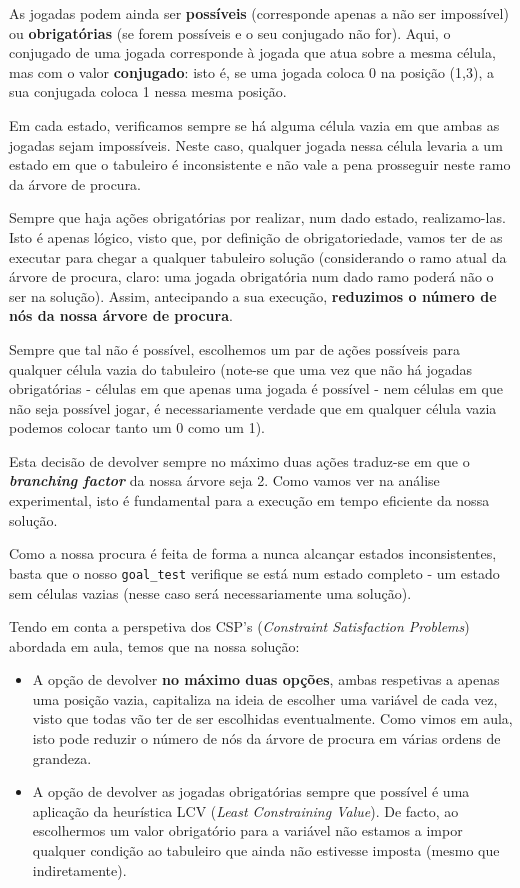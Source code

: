 \documentclass[12pt,a4paper]{article}
\begin{document}
As jogadas podem ainda ser \textbf{possíveis} (corresponde apenas a não ser impossível)
ou \textbf{obrigatórias} (se forem possíveis e o seu conjugado não for).
Aqui, o conjugado de uma jogada corresponde à jogada que atua sobre a mesma célula,
mas com o valor \textbf{conjugado}: isto é, se uma jogada coloca 0 na posição (1,3),
a sua conjugada coloca 1 nessa mesma posição.

Em cada estado, verificamos sempre se há alguma célula vazia em que ambas as jogadas
sejam impossíveis.
Neste caso, qualquer jogada nessa célula levaria a um estado em que o tabuleiro é
inconsistente e não vale a pena prosseguir neste ramo da árvore de procura.

Sempre que haja ações obrigatórias por realizar, num dado estado, realizamo-las.
Isto é apenas lógico, visto que, por definição de obrigatoriedade, vamos ter de
as executar para chegar a qualquer tabuleiro solução (considerando o ramo
atual da árvore de procura, claro: uma jogada obrigatória num dado ramo poderá
não o ser na solução).
Assim, antecipando a sua execução, \textbf{reduzimos o número de nós da nossa árvore de procura}.

Sempre que tal não é possível, escolhemos um par de ações possíveis para qualquer
célula vazia do tabuleiro (note-se que uma vez que não há jogadas obrigatórias -
células em que apenas uma jogada é possível - nem células em que não seja possível jogar,
é necessariamente verdade que em qualquer célula vazia podemos colocar tanto um 0 como um 1).

Esta decisão de devolver sempre no máximo duas ações traduz-se em que o \textbf{\textit{branching factor}}
da nossa árvore seja 2.
Como vamos ver na análise experimental, isto é fundamental para a execução em tempo
eficiente da nossa solução.

Como a nossa procura é feita de forma a nunca alcançar estados inconsistentes, basta
que o nosso \texttt{goal\_test} verifique se está num estado completo - um estado
sem células vazias (nesse caso será necessariamente uma solução).

Tendo em conta a perspetiva dos CSP's (\textit{Constraint Satisfaction Problems})
abordada em aula, temos que na nossa solução:
\begin{itemize}
      \item A opção de devolver \textbf{no máximo duas opções}, ambas respetivas a apenas uma
            posição vazia, capitaliza na ideia de escolher uma variável de cada vez, visto
            que todas vão ter de ser escolhidas eventualmente.
            Como vimos em aula, isto pode reduzir o número de nós da árvore de procura
            em várias ordens de grandeza.
      \item A opção de devolver as jogadas obrigatórias sempre que possível é uma
            aplicação da heurística LCV (\textit{Least Constraining Value}).
            De facto, ao escolhermos um valor obrigatório para a variável não estamos
            a impor qualquer condição ao tabuleiro que ainda não estivesse imposta
            (mesmo que indiretamente).
\end{itemize}
\end{document}
